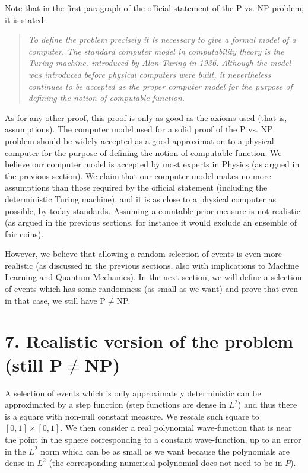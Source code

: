 \documentclass[11pt,a4paper]{report}
\begin{document}
Note that in the first paragraph of the official statement of the P vs.
NP problem\cite{pvsnp}, it is stated:

\begin{quote}
\emph{To define the problem precisely it is necessary to give a formal
model of a computer. The standard computer model in computability theory
is the Turing machine, introduced by Alan Turing in 1936.}
\emph{Although the model was introduced before physical computers were
built, it nevertheless continues to be accepted as the proper computer
model for the purpose of defining the notion of computable function.}
\end{quote}

As for any other proof, this proof is only as good as the axioms used
(that is, assumptions). The computer model used for a solid proof of the
P vs. NP problem should be widely accepted as a good approximation to a
physical computer for the purpose of defining the notion of computable
function. We believe our computer model is accepted by most experts in
Physics (as argued in the previous section). We claim that our computer
model makes no more assumptions than those required by the official
statement\cite{pvsnp} (including the
deterministic Turing machine), and it is as close to a physical computer
as possible, by today standards. Assuming a countable prior measure is
not realistic (as argued in the previous sections, for instance it would
exclude an ensemble of fair coins).

However, we believe that allowing a random selection of events is even
more realistic (as discussed in the previous sections, also with
implications to Machine Learning and Quantum Mechanics). In the next
section, we will define a selection of events which has some randomness
(as small as we want) and prove that even in that case, we still have
P\(\neq\)NP.

\hypertarget{realistic-version-of-the-problem-still-pneqnp}{%
\section{\texorpdfstring{7. Realistic version of the problem (still
P\(\neq\)NP)}{7. Realistic version of the problem (still P\textbackslash neqNP)}}\label{realistic-version-of-the-problem-still-pneqnp}}

A selection of events which is only approximately deterministic can be
approximated by a step function (step functions are dense in \(L^2\))
and thus there is a square with non-null constant measure. We rescale
such square to \([0,1]\times[0,1]\). We then consider a real polynomial
wave-function that is near the point in the sphere corresponding to a
constant wave-function, up to an error in the \(L^2\) norm which can be
as small as we want because the polynomials are dense in \(L^2\) (the
corresponding numerical polynomial does not need to be in \(P\)).
\end{document}
